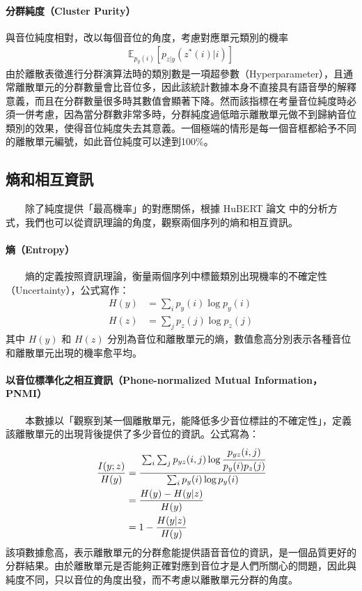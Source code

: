 {\paragraph{分群純度（Cluster Purity）}\hfill \break
%
        與音位純度相對，改以每個音位的角度，考慮對應單元類別的機率
\begin{align}
    \mathbb{E}_{p_y(i)}\left[p_{z|y}(z^*(i)|i) \right]
\end{align}
        由於離散表徵進行分群演算法時的類別數是一項超參數（Hyperparameter），且通常離散單元的分群數量會比音位多，因此該統計數據本身不直接具有語音學的解釋意義，而且在分群數量很多時其數值會顯著下降。然而該指標在考量音位純度時必須一併考慮，因為當分群數非常多時，分群純度過低暗示離散單元做不到歸納音位類別的效果，使得音位純度失去其意義。一個極端的情形是每一個音框都給予不同的離散單元編號，如此音位純度可以達到100\%。

\subsection{熵和相互資訊}

　　除了純度提供「最高機率」的對應關係，根據 HuBERT 論文 \cite{hsu_hubert_2021-2} 中的分析方式，我們也可以從資訊理論的角度，觀察兩個序列的熵和相互資訊。

\paragraph{熵（Entropy）} \hfill \break
%
　　熵的定義按照資訊理論，衡量兩個序列中標籤類別出現機率的不確定性（Uncertainty），公式寫作：
\begin{align}
    H(y) & = \sum_i{p_y(i)\log p_y(i)} \\
    H(z) & = \sum_j{p_z(j)\log p_z(j)}
\end{align}
其中 $H(y)$ 和 $H(z)$ 分別為音位和離散單元的熵，數值愈高分別表示各種音位和離散單元出現的機率愈平均。

\paragraph{以音位標準化之相互資訊（Phone-normalized Mutual Information，PNMI）}\hfill \break
%
　　本數據以「觀察到某一個離散單元，能降低多少音位標註的不確定性」，定義該離散單元的出現背後提供了多少音位的資訊。公式寫為：
\begin{align}
    \frac{I(y;z)}{H(y)} & =\cfrac{\sum_i \sum_j p_{yz}(i, j) \log \cfrac{p_{yz}(i, j)}{p_y(i)p_z(j)}}{\sum_i p_y(i) \log p_y(i)} \\
                        & =\frac{H(y)-H(y|z)}{H(y)}                                                                              \\
                        & =1-\frac{H(y|z)}{H(y)}
\end{align}
        該項數據愈高，表示離散單元的分群愈能提供語音音位的資訊，是一個品質更好的分群結果。由於離散單元是否能夠正確對應到音位才是人們所關心的問題，因此與純度不同，只以音位的角度出發，而不考慮以離散單元分群的角度。

}
